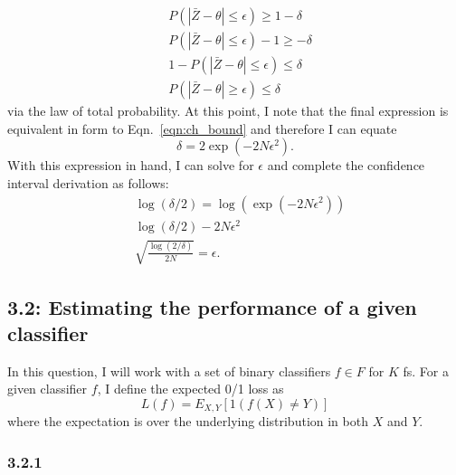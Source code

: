 \documentclass[12pt]{amsart}
\begin{document}
\begin{equation}
\begin{split}
& P(|\bar{Z} - \theta| \leq \epsilon) \geq 1 - \delta \\
& P(|\bar{Z} - \theta| \leq \epsilon) - 1 \geq - \delta \\
& 1- P(|\bar{Z} - \theta| \leq \epsilon) \leq \delta \\
& P(|\bar{Z} - \theta| \geq \epsilon) \leq \delta
\end{split}
\end{equation}
via the law of total probability.  At this point, I note that the final expression is equivalent in form to Eqn.~\ref{eqn:ch_bound} and therefore I can equate
\begin{equation}
\delta = 2 \exp(-2N \epsilon^2).
\end{equation}
With this expression in hand, I can solve for $\epsilon$ and complete the confidence interval derivation as follows:
\begin{equation} \label{eqn:eps_bound}
\begin{split}
& \log (\delta/2) = \log(\exp(-2N \epsilon^2)) \\
& \log(\delta/2) -2N \epsilon^2 \\
& \sqrt{\frac{\log(2/\delta)}{2N}} = \epsilon .
\end{split}
\end{equation}

\subsection*{3.2: Estimating the performance of a given classifier}

In this question, I will work with a set of binary classifiers $f \in F$ for $K$ fs.  For a given classifier $f$, I define the expected 0/1 loss as
\begin{equation} \label{eqn:loss_01}
L(f) = E_{X,Y}[1(f(X) \neq Y)]
\end{equation}
where the expectation is over the underlying distribution in both $X$ and $Y$.

\subsubsection*{3.2.1}
\end{document}
